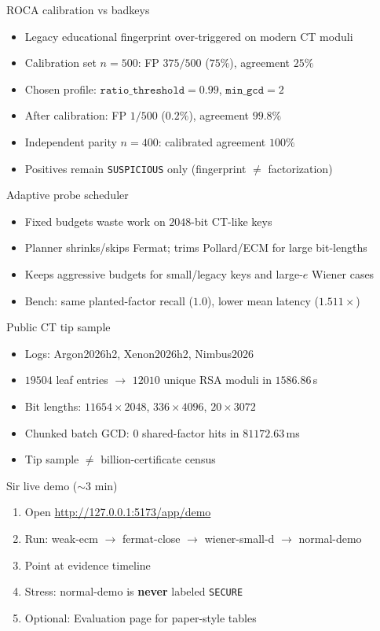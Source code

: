 \documentclass[aspectratio=169,11pt]{beamer}
\begin{document}
\begin{frame}{ROCA calibration vs badkeys}
  \begin{itemize}
    \item Legacy educational fingerprint over-triggered on modern CT moduli
    \item Calibration set $n{=}500$: FP $375/500$ ($75\%$), agreement $25\%$
    \item Chosen profile: $\texttt{ratio\_threshold}{=}0.99$, $\texttt{min\_gcd}{=}2$
    \item After calibration: FP $1/500$ ($0.2\%$), agreement $99.8\%$
    \item Independent parity $n{=}400$: calibrated agreement $100\%$
    \item Positives remain \texttt{SUSPICIOUS} only (fingerprint $\neq$ factorization)
  \end{itemize}
\end{frame}

\begin{frame}{Adaptive probe scheduler}
  \begin{itemize}
    \item Fixed budgets waste work on $2048$-bit CT-like keys
    \item Planner shrinks/skips Fermat; trims Pollard/ECM for large bit-lengths
    \item Keeps aggressive budgets for small/legacy keys and large-$e$ Wiener cases
    \item Bench: same planted-factor recall ($1.0$), lower mean latency ($1.511\times$)
  \end{itemize}
\end{frame}

\begin{frame}{Public CT tip sample}
  \begin{itemize}
    \item Logs: Argon2026h2, Xenon2026h2, Nimbus2026
    \item $19504$ leaf entries $\to$ $12010$ unique RSA moduli in $1586.86$\,s
    \item Bit lengths: $11654\times 2048$, $336\times 4096$, $20\times 3072$
    \item Chunked batch GCD: $0$ shared-factor hits in $81172.63$\,ms
    \item Tip sample $\neq$ billion-certificate census
  \end{itemize}
\end{frame}

\begin{frame}{Sir live demo ($\sim$3 min)}
  \begin{enumerate}
    \item Open \url{http://127.0.0.1:5173/app/demo}
    \item Run: weak-ecm $\to$ fermat-close $\to$ wiener-small-d $\to$ normal-demo
    \item Point at evidence timeline
    \item Stress: normal-demo is \textbf{never} labeled \texttt{SECURE}
    \item Optional: Evaluation page for paper-style tables
  \end{enumerate}
\end{frame}
\end{document}
